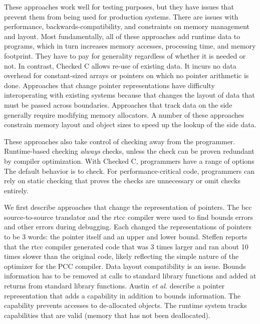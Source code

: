 These approaches work well for testing purposes, but they have issues that
prevent them from being used for production systems.  There are issues
with performance, backwards-compatibility, and constraints on memory
management and layout.  Most fundamentally, all of these approaches add
runtime data to programs, which in turn increases memory accesses, processing 
time, and memory footprint.  They have to pay for generality regardless of
whether it is needed or not. In contrast, Checked C allows re-use of existing data.
It incurs no data overhead for constant-sized arrays or pointers on which no pointer arithmetic is done.   Approaches that change
pointer representations have difficulty interoperating with existing
systems because that changes the layout of data that must be passed
across boundaries.  Approaches that track data on the side generally
require modifying memory allocators.  A number of these
approaches constrain memory layout and object sizes to speed up the lookup of
the side data.

These approaches also take control of checking away from the programmer.
Runtime-based checking {\em always} checks, unless the check can be proven 
redundant by compiler optimization.   With Checked C, programmers have
a range of options   The default behavior is to check. For performance-critical
code, programmers can rely on static checking that proves the checks
are unnecessary or omit checks entirely.

We first describe approaches that change the representation of pointers.
The bcc source-to-source translator \cite{Kendall1983} and the rtcc
compiler \cite{Steffen1992} were used to find bounds errors and
other errors during debugging.  Each changed the representations of pointers to be 
3 words: the pointer itself and an upper and lower bound.   
Steffen \cite{Steffen1992} reports that the rtcc compiler generated code
that was 3 times larger and ran about 10 times slower than the original code, 
likely reflecting the simple nature of  the optimizer for the PCC compiler.  Data
layout compatibility is an issue.  Bounds information has to be removed at calls to
standard library  functions and added at returns from standard library functions.
Austin {\it et al.} \cite{Austin1994} describe a pointer representation that
adds a capability in addition to bounds information.  The capability prevents
accesses to de-allocated objects.  The runtime system tracks capabilities that
are valid (memory that has not been deallocated).  

